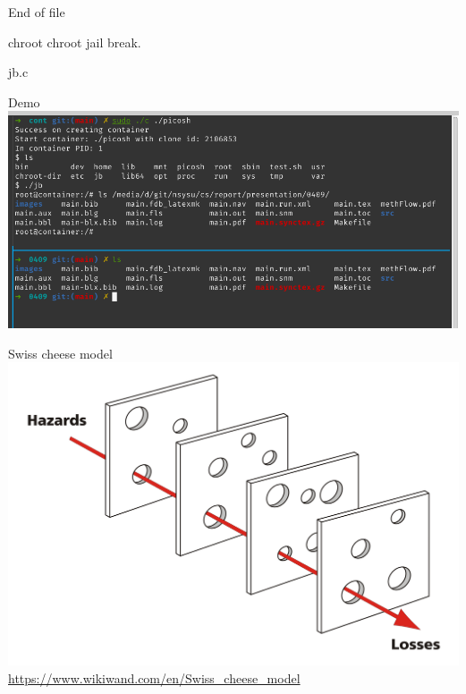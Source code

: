 \documentclass{beamer}
\begin{document}
\begin{CJK*}{UTF8}{bsmi}
    \begin{frame}{End of file}
        
    \end{frame}

    \begin{frame}{chroot}
        \centering\Large{chroot jail break.}
    \end{frame}

    \begin{frame}{jb.c}
        
    \end{frame}

    \begin{frame}{Demo}
        \centering\includegraphics[width=\textwidth]{Screenshot_2021-04-09_09-44-40.png}
    \end{frame}

    \begin{frame}{Swiss cheese model}
        \centering\includegraphics[width=.8\textwidth]{Swiss_cheese_model_of_accident_causation.png}
        \url{https://www.wikiwand.com/en/Swiss_cheese_model}
    \end{frame}


\end{CJK*}
\end{document}
